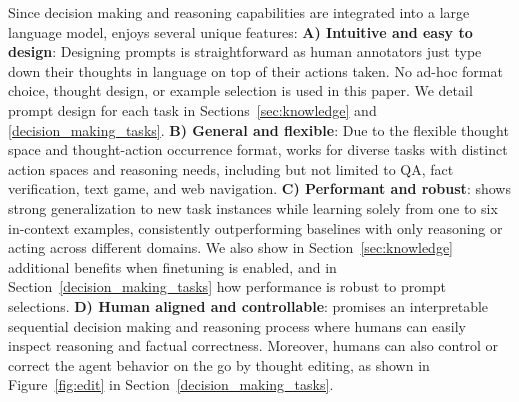 Since decision making and reasoning capabilities are integrated into a large language model, \model{} enjoys several unique features:
    \textbf{A) Intuitive and easy to design}: Designing \model{} prompts is straightforward as human annotators just type down their thoughts in language on top of their actions taken. No ad-hoc format choice, thought design, or example selection is used in this paper. We detail prompt design for each task in Sections~\ref{sec:knowledge} and \ref{decision_making_tasks}.
    \textbf{B) General and flexible}: Due to the flexible thought space and thought-action occurrence format, \model{} works for diverse tasks with distinct action spaces and reasoning needs, including but not limited to QA, fact verification, text game, and web navigation.
    \textbf{C) Performant and robust}: \model{} shows strong generalization to new task instances while learning solely from one to six in-context examples, consistently outperforming baselines with only reasoning or acting across different domains. We also show in Section~\ref{sec:knowledge} additional benefits when finetuning is enabled, and in Section~\ref{decision_making_tasks} how \model{} performance is robust to prompt selections.
    \textbf{D) Human aligned and controllable}: \model{} promises an interpretable sequential decision making and reasoning process where humans can easily inspect reasoning and factual correctness. Moreover, humans can also control or correct the agent behavior on the go by thought editing, as shown in Figure~\ref{fig:edit} in Section~\ref{decision_making_tasks}.































